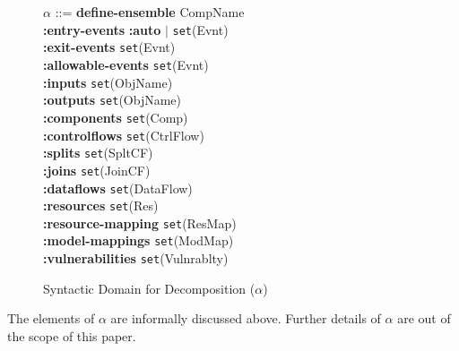 \documentclass[conference]{IEEEtran}
\begin{document}
\begin{figure}[ht]
\begin{tabbing}
$\alpha$ ::= \textbf{define-}\=\textbf{ensemble} CompName
\\\> \textbf{:entry-events} \hspace*{1cm} \textbf{:auto} $|$ \texttt{set}(Evnt)
\\\> \textbf{:exit-events} \hspace*{1.3cm} \texttt{set}(Evnt)
\\\> \textbf{:allowable-events} \hspace*{0.4cm} \texttt{set}(Evnt)
\\\> \textbf{:inputs} \hspace*{1.95cm} \texttt{set}(ObjName)
\\\> \textbf{:outputs} \hspace*{1.75cm} \texttt{set}(ObjName)
\\\> \textbf{:components} \hspace*{1.1cm} \texttt{set}(Comp)
\\\> \textbf{:controlflows} \hspace*{1.05cm} \texttt{set}(CtrlFlow)
\\\> \textbf{:splits} \hspace*{2.1cm} \texttt{set}(SpltCF)
\\\> \textbf{:joins} \hspace*{2.15cm} \texttt{set}(JoinCF)
\\\> \textbf{:dataflows} \hspace*{1.5cm} \texttt{set}(DataFlow)
\\\> \textbf{:resources} \hspace*{1.55cm} \texttt{set}(Res)
\\\> \textbf{:resource-mapping} \hspace*{0.25cm} \texttt{set}(ResMap)
\\\> \textbf{:model-mappings} \hspace*{0.5cm} \texttt{set}(ModMap)
\\\> \textbf{:vulnerabilities} \hspace*{0.8cm} \texttt{set}(Vulnrablty)
\end{tabbing}
\caption{Syntactic Domain for Decomposition ($\alpha$)}
\label{fig:decomp}
\end{figure}
The elements of $\alpha$ are informally discussed above. Further details of $\alpha$ are out of the scope of this paper.
\end{document}
